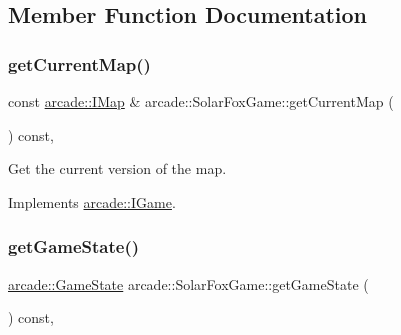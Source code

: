 \subsection{Member Function Documentation}
\mbox{\label{classarcade_1_1_solar_fox_game_a8bb422466d4367320e90c6f9c6b754ed}} 
\subsubsection{\texorpdfstring{get\+Current\+Map()}{getCurrentMap()}}
{\footnotesize\ttfamily const \hyperlink{classarcade_1_1_i_map}{arcade\+::\+I\+Map} \& arcade\+::\+Solar\+Fox\+Game\+::get\+Current\+Map (\begin{DoxyParamCaption}{ }\end{DoxyParamCaption}) const\hspace{0.3cm}{\ttfamily [override]}, {\ttfamily [virtual]}}



Get the current version of the map. 



Implements \hyperlink{classarcade_1_1_i_game_a2e1791071bf65ee35e249e409ee29044}{arcade\+::\+I\+Game}.

\mbox{\label{classarcade_1_1_solar_fox_game_a71122936c223e672058280755f24a98a}} 
\subsubsection{\texorpdfstring{get\+Game\+State()}{getGameState()}}
{\footnotesize\ttfamily \hyperlink{namespacearcade_a6adca89ee2f539b03980c7e59b044ed7}{arcade\+::\+Game\+State} arcade\+::\+Solar\+Fox\+Game\+::get\+Game\+State (\begin{DoxyParamCaption}{ }\end{DoxyParamCaption}) const\hspace{0.3cm}{\ttfamily [override]}, {\ttfamily [virtual]}}



